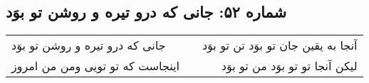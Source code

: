 \begin{center}
\section*{شماره ۵۲: جانی که درو تیره و روشن تو بوَد}
\label{sec:052}
\begin{longtable}{l p{0.5cm} r}
جانی که درو تیره و روشن تو بوَد
&&
آنجا به یقین جان تو بوَد تن تو بوَد
\\
اینجاست که تو تویی ومن من امروز
&&
لیکن آنجا تو تو بوَد من تو بوَد
\\
\end{longtable}
\end{center}
